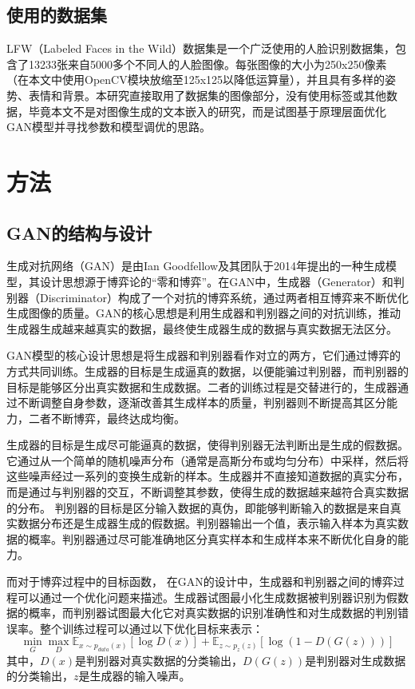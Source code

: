 \documentclass[UTF8]{ctexart}
\begin{document}
\subsection{使用的数据集}
LFW（Labeled Faces in the Wild）数据集是一个广泛使用的人脸识别数据集，包含了13233张来自5000多个不同人的人脸图像。每张图像的大小为250x250像素（在本文中使用OpenCV模块放缩至125x125以降低运算量），并且具有多样的姿势、表情和背景。本研究直接取用了数据集的图像部分，没有使用标签或其他数据，毕竟本文不是对图像生成的文本嵌入的研究，而是试图基于原理层面优化GAN模型并寻找参数和模型调优的思路。
\section{方法}
\subsection{GAN的结构与设计}
生成对抗网络（GAN）是由Ian Goodfellow及其团队于2014年提出的一种生成模型，其设计思想源于博弈论的“零和博弈”。在GAN中，生成器（Generator）和判别器（Discriminator）构成了一个对抗的博弈系统，通过两者相互博弈来不断优化生成图像的质量。GAN的核心思想是利用生成器和判别器之间的对抗训练，推动生成器生成越来越真实的数据，最终使生成器生成的数据与真实数据无法区分。\par
GAN模型的核心设计思想是将生成器和判别器看作对立的两方，它们通过博弈的方式共同训练。生成器的目标是生成逼真的数据，以便能骗过判别器，而判别器的目标是能够区分出真实数据和生成数据。二者的训练过程是交替进行的，生成器通过不断调整自身参数，逐渐改善其生成样本的质量，判别器则不断提高其区分能力，二者不断博弈，最终达成均衡。\par
生成器的目标是生成尽可能逼真的数据，使得判别器无法判断出是生成的假数据。它通过从一个简单的随机噪声分布（通常是高斯分布或均匀分布）中采样，然后将这些噪声经过一系列的变换生成新的样本。生成器并不直接知道数据的真实分布，而是通过与判别器的交互，不断调整其参数，使得生成的数据越来越符合真实数据的分布。 判别器的目标是区分输入数据的真伪，即能够判断输入的数据是来自真实数据分布还是生成器生成的假数据。判别器输出一个值，表示输入样本为真实数据的概率。判别器通过尽可能准确地区分真实样本和生成样本来不断优化自身的能力。\par
而对于博弈过程中的目标函数， 在GAN的设计中，生成器和判别器之间的博弈过程可以通过一个优化问题来描述。生成器试图最小化生成数据被判别器识别为假数据的概率，而判别器试图最大化它对真实数据的识别准确性和对生成数据的判别错误率。整个训练过程可以通过以下优化目标来表示：
$$\min_G \max_D \mathbb{E}_{x \sim p_{data}(x)}[\log D(x)] + \mathbb{E}_{z \sim p_z(z)}[\log (1 - D(G(z)))]$$
其中，$D(x)$是判别器对真实数据的分类输出，$D(G(z))$是判别器对生成数据的分类输出，$z$是生成器的输入噪声。
\end{document}

